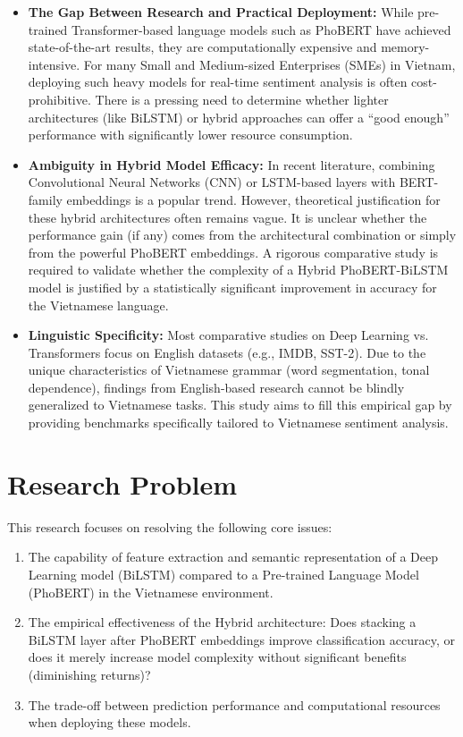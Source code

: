 \documentclass[12pt]{report} %
\begin{document}
\begin{itemize}
    \item \textbf{The Gap Between Research and Practical Deployment:} While pre-trained Transformer-based language models such as PhoBERT have achieved state-of-the-art results, they are computationally expensive and memory-intensive. For many Small and Medium-sized Enterprises (SMEs) in Vietnam, deploying such heavy models for real-time sentiment analysis is often cost-prohibitive. There is a pressing need to determine whether lighter architectures (like BiLSTM) or hybrid approaches can offer a ``good enough'' performance with significantly lower resource consumption.

    \item \textbf{Ambiguity in Hybrid Model Efficacy:} In recent literature, combining Convolutional Neural Networks (CNN) or LSTM-based layers with BERT-family embeddings is a popular trend. However, theoretical justification for these hybrid architectures often remains vague. It is unclear whether the performance gain (if any) comes from the architectural combination or simply from the powerful PhoBERT embeddings. A rigorous comparative study is required to validate whether the complexity of a Hybrid PhoBERT-BiLSTM model is justified by a statistically significant improvement in accuracy for the Vietnamese language.

    \item \textbf{Linguistic Specificity:} Most comparative studies on Deep Learning vs. Transformers focus on English datasets (e.g., IMDB, SST-2). Due to the unique characteristics of Vietnamese grammar (word segmentation, tonal dependence), findings from English-based research cannot be blindly generalized to Vietnamese tasks. This study aims to fill this empirical gap by providing benchmarks specifically tailored to Vietnamese sentiment analysis.
\end{itemize}

\section{Research Problem}

This research focuses on resolving the following core issues:
\begin{enumerate}
    \item The capability of feature extraction and semantic representation of a Deep Learning model (BiLSTM) compared to a Pre-trained Language Model (PhoBERT) in the Vietnamese environment.
    \item The empirical effectiveness of the Hybrid architecture: Does stacking a BiLSTM layer after PhoBERT embeddings improve classification accuracy, or does it merely increase model complexity without significant benefits (diminishing returns)?
    \item The trade-off between prediction performance and computational resources when deploying these models.
\end{enumerate}
\end{document}
